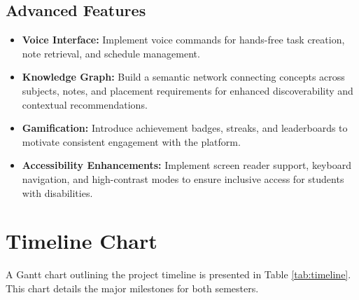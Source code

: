 \documentclass[12pt]{article}
\begin{document}
\subsection{Advanced Features}
\begin{itemize}
    \item \textbf{Voice Interface:} Implement voice commands for hands-free task creation, note retrieval, and schedule management.
    
    \item \textbf{Knowledge Graph:} Build a semantic network connecting concepts across subjects, notes, and placement requirements for enhanced discoverability and contextual recommendations.
    
    \item \textbf{Gamification:} Introduce achievement badges, streaks, and leaderboards to motivate consistent engagement with the platform.
    
    \item \textbf{Accessibility Enhancements:} Implement screen reader support, keyboard navigation, and high-contrast modes to ensure inclusive access for students with disabilities.
\end{itemize}

\section{Timeline Chart}
A Gantt chart outlining the project timeline is presented in Table \ref{tab:timeline}. This chart details the major milestones for both semesters.
\end{document}
